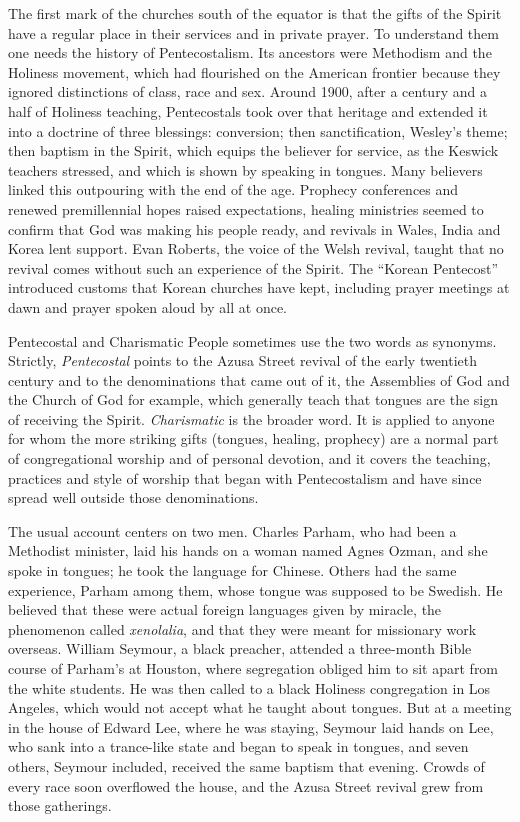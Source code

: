 The first mark of the churches south of the equator is that the gifts of the Spirit have a regular
place in their services and in private prayer. To understand them one needs the history of
Pentecostalism. Its ancestors were Methodism and the Holiness movement, which had flourished on the
American frontier because they ignored distinctions of class, race and sex. Around 1900, after a
century and a half of Holiness teaching, Pentecostals took over that heritage and extended it into a
doctrine of three blessings: conversion; then sanctification, Wesley's theme; then baptism in the
Spirit, which equips the believer for service, as the Keswick teachers stressed, and which is shown
by speaking in tongues. Many believers linked this outpouring with the end of the age. Prophecy
conferences and renewed premillennial hopes raised expectations, healing ministries seemed to confirm
that God was making his people ready, and revivals in Wales, India and Korea lent support. Evan
Roberts, the voice of the Welsh revival, taught that no revival comes without such an experience of
the Spirit. The ``Korean Pentecost'' introduced customs that Korean churches have kept, including
prayer meetings at dawn and prayer spoken aloud by all at once.

\begin{sidebox}{Pentecostal and Charismatic}
People sometimes use the two words as synonyms. Strictly, \emph{Pentecostal} points to the Azusa
Street revival of the early twentieth century and to the denominations that came out of it, the
Assemblies of God and the Church of God for example, which generally teach that tongues are the sign
of receiving the Spirit. \emph{Charismatic} is the broader word. It is applied to anyone for whom the
more striking gifts (tongues, healing, prophecy) are a normal part of congregational worship and of
personal devotion, and it covers the teaching, practices and style of worship that began with
Pentecostalism and have since spread well outside those denominations.
\end{sidebox}

The usual account centers on two men. Charles Parham, who had been a Methodist minister, laid his
hands on a woman named Agnes Ozman, and she spoke in tongues; he took the language for Chinese.
Others had the same experience, Parham among them, whose tongue was supposed to be Swedish. He
believed that these were actual foreign languages given by miracle, the phenomenon called
\emph{xenolalia}, and that they were meant for missionary work overseas. William Seymour, a black
preacher, attended a three-month Bible course of Parham's at Houston, where segregation obliged him
to sit apart from the white students. He was then called to a black Holiness congregation in Los
Angeles, which would not accept what he taught about tongues. But at a meeting in the house of Edward
Lee, where he was staying, Seymour laid hands on Lee, who sank into a trance-like state and began to
speak in tongues, and seven others, Seymour included, received the same baptism that evening. Crowds
of every race soon overflowed the house, and the Azusa Street revival grew from those gatherings.

